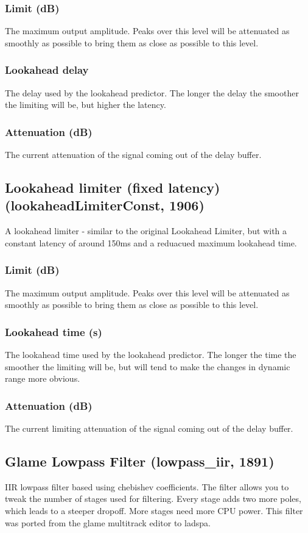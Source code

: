 \documentclass[11pt]{article}
\begin{document}
\subsubsection*{Limit (dB)}
The maximum output amplitude. Peaks over this level will be attenuated as smoothly as possible to bring them as close as possible to this level.\subsubsection*{Lookahead delay}
The delay used by the lookahead predictor. The longer the delay the smoother the limiting will be, but higher the latency.\subsubsection*{Attenuation (dB)}
The current attenuation of the signal coming out of the delay buffer.\subsection{Lookahead limiter (fixed latency) (lookaheadLimiterConst, 1906)\label{lookaheadLimiterConst}\label{id1906}}
A lookahead limiter - similar to the original Lookahead Limiter, but
with a constant latency of around 150ms and a reduacued maximum lookahead
time.\subsubsection*{Limit (dB)}
The maximum output amplitude. Peaks over this level will be attenuated as smoothly as possible to bring them as close as possible to this level.\subsubsection*{Lookahead time (s)}
The lookahead time used by the lookahead predictor. The longer the time the smoother the limiting will be, but will tend to make the changes in dynamic range more obvious.\subsubsection*{Attenuation (dB)}
The current limiting attenuation of the signal coming out of the delay
buffer.\subsection{Glame Lowpass Filter (lowpass\_iir, 1891)\label{lowpass_iir}\label{id1891}}
 IIR lowpass filter based using chebishev coefficients. The filter allows you to tweak the number of stages used for
                filtering. Every stage adds two more poles, which leads to a steeper dropoff. More stages need more CPU power. This
                filter was ported from the glame multitrack editor to ladspa.
\end{document}
